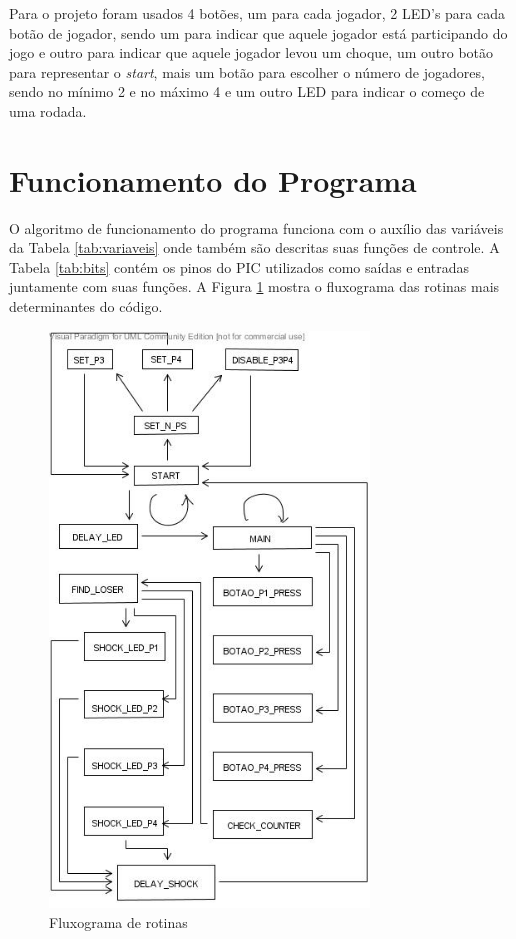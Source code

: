\documentclass[article]{IEEEtran}
\begin{document}
Para o projeto foram usados 4 botões, um para cada jogador, 2 LED's para cada botão de jogador, sendo um para indicar que aquele jogador está participando do jogo e outro para indicar que aquele jogador levou um choque, um outro botão para representar o \textit{start}, mais um botão para escolher o número de jogadores, sendo no mínimo 2 e no máximo 4 e um outro LED para indicar o começo de uma rodada. 
 
\section{Funcionamento do Programa}
O algoritmo de funcionamento do programa funciona com o auxílio das variáveis da Tabela \ref{tab:variaveis} onde também são descritas suas funções de controle. A Tabela \ref{tab:bits} contém os pinos do PIC utilizados como saídas e entradas juntamente com suas funções. A Figura \ref{fig:fluxograma} mostra o fluxograma das rotinas  mais determinantes do código.

\begin{figure}	
		\centering
		\includegraphics[width=8.5cm]{./fluxograma.jpg}
		\caption{Fluxograma de rotinas}
 		\label{fig:fluxograma}
\end{figure}
\end{document}
